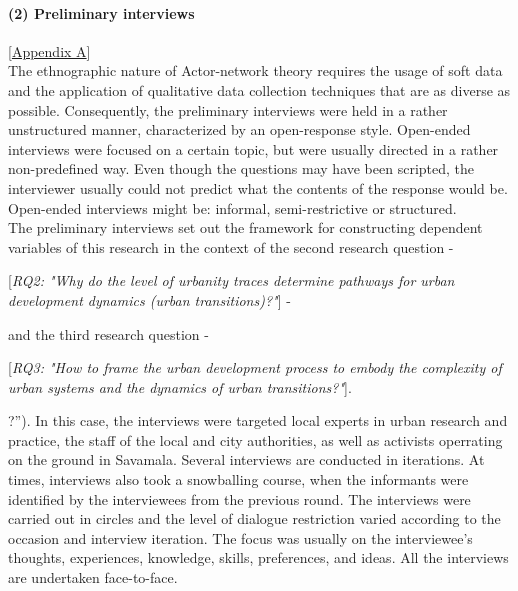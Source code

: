 \documentclass[11pt]{report}
\begin{document}
\paragraph{(2) Preliminary interviews} 
[\href{ref}{Appendix A}]
\\
The ethnographic nature of Actor-network theory requires the usage of soft data and the application of qualitative data collection techniques that are as diverse as possible. Consequently, the preliminary interviews were held in a rather unstructured manner, characterized by an open-response style. Open-ended interviews were focused on a certain topic, but were usually directed in a rather non-predefined way.  Even though the questions may have been scripted, the interviewer usually could not predict what the contents of the response would be. Open-ended interviews might be: informal, semi-restrictive or structured.
\\

The preliminary interviews set out the framework for constructing dependent variables of this research in the context of the second research question -

[\textit{RQ2: "Why do the level of urbanity traces determine pathways for urban development dynamics (urban transitions)?"}] -

and the third research question -

[\textit{RQ3: "How to frame the  urban development process to embody the complexity of urban systems and the dynamics of urban transitions?"}].

?”). In this case, the interviews were targeted local experts in urban research and practice, the staff of the local and city authorities, as well as activists operrating on the ground in Savamala. Several interviews are conducted in iterations. At times, interviews also took a snowballing course, when the informants were identified by the interviewees from the previous round. The interviews were carried out in circles and the level of dialogue restriction varied according to the occasion and interview iteration. The focus was usually on the interviewee’s thoughts, experiences, knowledge, skills, preferences, and ideas. All the interviews are undertaken face-to-face.
\\
\end{document}
